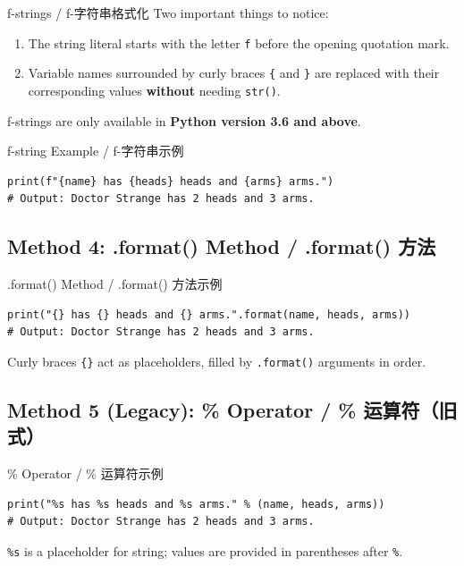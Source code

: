 \documentclass[11pt,a4paper]{article}
\begin{document}
\begin{concept}{f-strings / f-字符串格式化}
    Two important things to notice:
    \begin{enumerate}
        \item The string literal starts with the letter \texttt{f} before the opening quotation mark.
        \item Variable names surrounded by curly braces \texttt{\{} and \texttt{\}} are replaced with their corresponding values \textbf{without} needing \texttt{str()}.
    \end{enumerate}
    f-strings are only available in \textbf{Python version 3.6 and above}.
\end{concept}

\begin{examplebox}{f-string Example / f-字符串示例}
\begin{lstlisting}
print(f"{name} has {heads} heads and {arms} arms.")
# Output: Doctor Strange has 2 heads and 3 arms.
\end{lstlisting}
\end{examplebox}

\subsection{Method 4: .format() Method / .format() 方法}

\begin{examplebox}{.format() Method / .format() 方法示例}
\begin{lstlisting}
print("{} has {} heads and {} arms.".format(name, heads, arms))
# Output: Doctor Strange has 2 heads and 3 arms.
\end{lstlisting}
    Curly braces \texttt{\{\}} act as placeholders, filled by \texttt{.format()} arguments in order.
\end{examplebox}

\subsection{Method 5 (Legacy): \% Operator / \% 运算符（旧式）}

\begin{examplebox}{\% Operator / \% 运算符示例}
\begin{lstlisting}
print("%s has %s heads and %s arms." % (name, heads, arms))
# Output: Doctor Strange has 2 heads and 3 arms.
\end{lstlisting}
    \texttt{\%s} is a placeholder for string; values are provided in parentheses after \texttt{\%}.
\end{examplebox}
\end{document}
